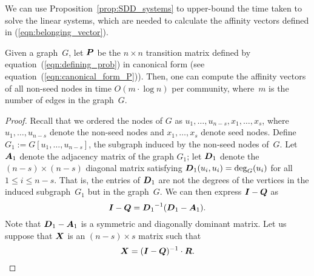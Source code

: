 We can use Proposition~\ref{prop:SDD_systems} to upper-bound the time taken to solve
the linear systems, which are needed to calculate the affinity vectors defined in (\ref{eqn:belonging_vector}).

\begin{theorem}\label{theorem:computing_NR}
Given a graph~$G$, let $\boldsymbol{P}$ be the $n \times n$ transition matrix 
defined by equation~(\ref{eqn:defining_prob}) in canonical form 
(see equation~(\ref{eqn:canonical_form_P})). Then, one can compute 
the affinity vectors of all non-seed nodes in time $O(m \cdot \log n)$ per community, 
where~$m$ is the number of edges in the graph~$G$.
\end{theorem}  
\begin{proof}
Recall that we ordered the nodes of $G$ as $u_1, \ldots, u_{n - s}, x_1, \ldots, x_s$, 
where $u_1, \ldots, u_{n - s}$ denote the non-seed nodes and $x_1, \ldots, x_s$ denote 
seed nodes. Define $G_1 := G[u_1, \ldots, u_{n - s}]$, the subgraph induced by the non-seed nodes 
of~$G$. Let $\boldsymbol{A}_1$ denote the adjacency matrix of the graph $G_1$; let 
$\boldsymbol{D}_1$ denote the $(n - s) \times (n - s)$ diagonal matrix satisfying 
$\boldsymbol{D}_1(u_i, u_i) = \deg_{G}(u_i)$ for all $1 \leq i \leq n - s$.  That is, the 
entries of $\boldsymbol{D}_1$ are not the degrees of the vertices in the induced subgraph~$G_1$ 
but in the graph~$G$. We can then express 
$\boldsymbol{I} - \boldsymbol{Q}$ as 
\begin{equation} \label{eqn:I-Q}
	\boldsymbol{I}  - \boldsymbol{Q} = {\boldsymbol{D}_1}^{-1} (\boldsymbol{D}_1 - \boldsymbol{A}_1).
\end{equation}
Note that $\boldsymbol{D}_1 - \boldsymbol{A}_1$ is a symmetric and diagonally dominant matrix. 
Let us suppose that $\boldsymbol{X}$ is an $(n - s) \times s$ matrix such that 
\[
	\boldsymbol{X} = (\boldsymbol{I} - \boldsymbol{Q})^{-1} \cdot \boldsymbol{R}.
\]


\end{proof}
